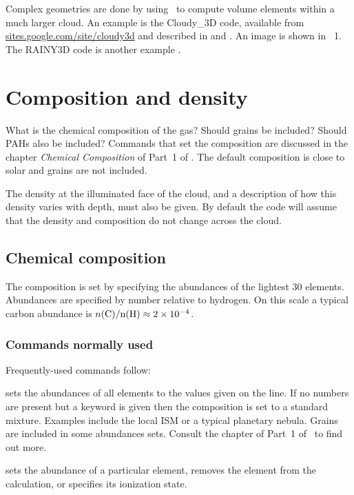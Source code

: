 \documentclass[12pt,twoside]{article}
\begin{document}
{Complex geometries are done by using \Cloudy\ to compute volume elements
within a much larger cloud.
An example is the Cloudy\_3D code,
available from 
\href{http://sites.google.com/site/cloudy3d/}{sites.google.com/site/cloudy3d}
and described in \citet{MorissetCloudy3D06}
and \citet{MorissetStasinskaCloudy3D08}.
An image is shown in \Hazy\ 1.
The RAINY3D code is another example 
\citep{MoraesDiazRAINY09}.


\section{Composition and density}
\label{sec:CompositionAndDensity}

What is the chemical composition of the gas?
Should grains be included?
Should PAHs also be included?
Commands that set the composition are discussed
in the chapter \emph{Chemical Composition} of Part~1 of \Hazy.
The default
composition is close to solar and grains are not included.

The density at the illuminated face of the cloud, and a description of
how this density varies with depth, must also be given.
By default the
code will assume that the density and composition do not change across the
cloud.

\subsection{Chemical composition}

The composition is set by specifying the abundances of the lightest
30 elements.
Abundances are specified by number relative to hydrogen.
On this scale a typical carbon abundance is
$n(\rm{C}) / n(\rm{H}) \approx 2\times 10^{-4}$.

\subsubsection{Commands normally used}

Frequently-used commands follow:

 sets the abundances
\label{command:abundances}
of all elements to the values given on
the line.  If no numbers are present but a keyword is given then the
composition is set to a standard mixture.  Examples include the local ISM
or a typical planetary nebula.  Grains are included in some abundances sets.
Consult the  chapter
of Part~1 of \Hazy\ to find out more.

 sets the abundance of
\label{command:element}
a particular element, removes the element
from the calculation, or specifies its ionization state.

}
\end{document}
